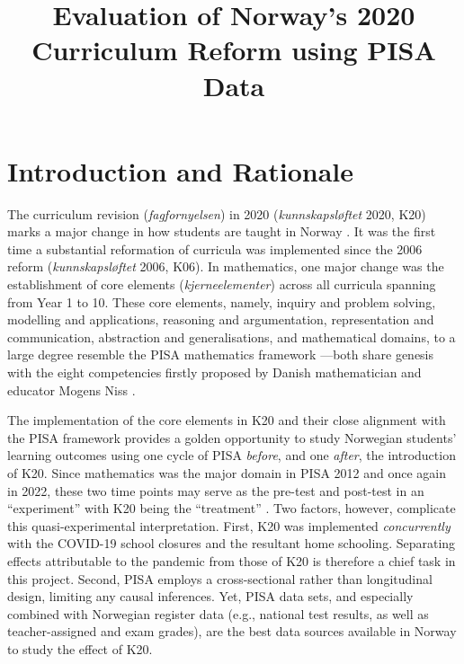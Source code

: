 \documentclass[
    a4paper,                %
    11pt,                   %
    stu,                    %
    donotrepeattitle,       %
    floatsintext,           %
    biblatex,               %
    colorlinks=true,        %
    linkcolor=red,          %
    anchorcolor=black,      %
    citecolor=blue,         %
    urlcolor=blue,          %
    bookmarks=true,         %
    bookmarksopen=false,    %
    bookmarksnumbered=true, %
    dvipsnames              %
]{apa7}
\title{Evaluation of Norway's 2020 Curriculum Reform using PISA Data}
\begin{document}
\maketitle

\setcounter{page}{1}

\section{Introduction and Rationale}

The curriculum revision (\textit{fagfornyelsen}) in 2020 (\textit{kunnskapsl{\o}ftet} 2020, K20) marks a major change in how students are taught in Norway \parencite{udir:2020}. It was the first time a substantial reformation of curricula was implemented since the 2006 reform (\textit{kunnskapsl{\o}ftet} 2006, K06). In mathematics, one major change was the establishment of core elements (\textit{kjerneelementer}) across all curricula spanning from Year 1 to 10. These core elements, namely, inquiry and problem solving, modelling and applications, reasoning and argumentation, representation and communication, abstraction and generalisations, and mathematical domains, to a large degree resemble the PISA mathematics framework \parencite{oecd:2018}---both share genesis with the eight competencies firstly proposed by Danish mathematician and educator Mogens Niss \parencite{niss:2003,niss:2011,niss:2019}.

The implementation of the core elements in K20 and their close alignment with the PISA framework provides a golden opportunity to study Norwegian students' learning outcomes using one cycle of PISA \emph{before}, and one \emph{after}, the introduction of K20. Since mathematics was the major domain in PISA 2012 and once again in 2022, these two time points may serve as the pre-test and post-test in an ``experiment'' with K20 being the ``treatment'' \parencite{shadish:2002}. Two factors, however, complicate this quasi-experimental interpretation. First, K20 was implemented \emph{concurrently} with the COVID-19 school closures and the resultant home schooling. Separating effects attributable to the pandemic from those of K20 is therefore a chief task in this project. Second, PISA employs a cross-sectional rather than longitudinal design, limiting any causal inferences. Yet, PISA data sets, and especially combined with Norwegian register data (e.g., national test results, as well as teacher-assigned and exam grades), are the best data sources available in Norway to study the effect of K20.
\end{document}
